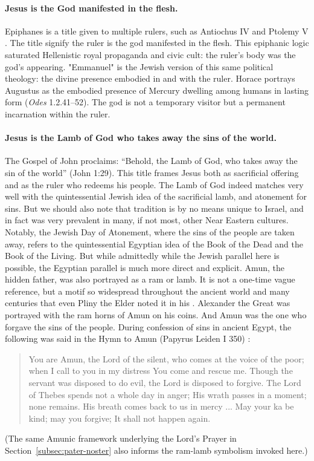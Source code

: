 \paragraph{Jesus is the God manifested in the flesh.}\label{par:jesus-is-the-god-manifested-in-the-flesh.}
Epiphanes is a title given to multiple rulers, such as Antiochus IV and Ptolemy V \cite{polybius:histories}.
The title signify the ruler is the god manifested in the flesh.
This epiphanic logic saturated Hellenistic royal propaganda and civic cult: the ruler’s body was the god’s appearing.
"Emmanuel" is the Jewish version of this same political theology: the divine presence embodied in and with the ruler.
Horace portrays Augustus as the embodied presence of Mercury dwelling among humans in lasting form (\emph{Odes} 1.2.41--52).
The god is not a temporary visitor but a permanent incarnation within the ruler.

\paragraph{Jesus is the Lamb of God who takes away the sins of the world.}\label{par:jesus-is-the-lamb-of-god-who-takes-away-the-sins-of-the-world.}
The Gospel of John proclaims: “Behold, the Lamb of God, who takes away the sin of the world” (John 1:29).
This title frames Jesus both as sacrificial offering and as the ruler who redeems his people.
The Lamb of God indeed matches very well with the quintessential Jewish idea of the sacrificial lamb, and atonement for sins.
But we should also note that tradition is by no means unique to Israel, and in fact was very prevalent in many, if not most, other Near Eastern cultures.
Notably, the Jewish Day of Atonement, where the sins of the people are taken away, refers to the quintessential Egyptian idea of the Book of the Dead and the Book of the Living.
But while admittedly while the Jewish parallel here is possible, the Egyptian parallel is much more direct and explicit.
Amun, the hidden father, was also portrayed as a ram or lamb.
It is not a one-time vague reference, but a motif so widespread throughout the ancient world and many centuries that even Pliny the Elder noted it in his \cite[37.60]{pliny:nh}.
Alexander the Great was portrayed with the ram horns of Amun on his coins.
And Amun was the one who forgave the sins of the people.
During confession of sins in ancient Egypt, the following was said in the Hymn to Amun (Papyrus Leiden I 350) \cite{assmann:searchgod}:
\begin{quote}
    You are Amun, the Lord of the silent, who comes at the voice of the poor; when I call to you in my distress You come and rescue me.
    Though the servant was disposed to do evil, the Lord is disposed to forgive.
    The Lord of Thebes spends not a whole day in anger;
    His wrath passes in a moment; none remains.
    His breath comes back to us in mercy ...
    May your ka be kind; may you forgive; It shall not happen again.
\end{quote}
(The same Amunic framework underlying the Lord's Prayer in Section~\ref{subsec:pater-noster} also informs the ram-lamb symbolism invoked here.)

